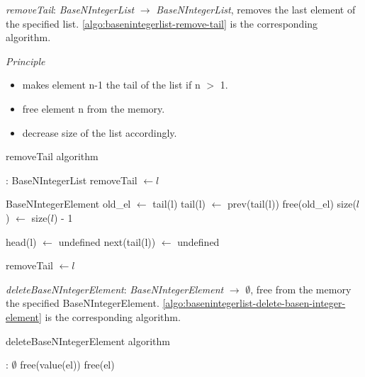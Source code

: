 \documentclass[book, nodocumentinfo]{upmethodology-document}
\begin{document}

\emph{removeTail}: \emph{BaseNIntegerList} \(\rightarrow\) \emph{BaseNIntegerList},
removes the last element of the specified list.
\ref{algo:basenintegerlist-remove-tail} is the corresponding algorithm.

\emph{Principle}
\begin{itemize}
    \item makes element n-1 the tail of the list if n \(>\) 1.
    \item free element n from the memory.
    \item decrease size of the list accordingly.
\end{itemize}

\begin{algorithm}[H]
    \label{algo:basenintegerlist-remove-tail}
    \caption{removeTail algorithm}

    \begin{algorithmic}
         : BaseNIntegerList
                \State removeTail \(\leftarrow l\)
            \EndIf

            \State BaseNIntegerElement old\_el \(\leftarrow\) tail(l)
            \State tail(l) \(\leftarrow\) prev(tail(l))
            \State free(old\_el)
            \State size(\(l\)) \(\leftarrow\) size(\(l\)) - 1

                \State head(l) \(\leftarrow\) undefined
            \Else
                \State next(tail(l)) \(\leftarrow\) undefined
            \EndIf

            \State removeTail \(\leftarrow l\)
        \EndFunction
    \end{algorithmic}
\end{algorithm}


\emph{deleteBaseNIntegerElement}: \emph{BaseNIntegerElement} \(\rightarrow\) \(\emptyset\),
free from the memory the specified BaseNIntegerElement.
\ref{algo:basenintegerlist-delete-basen-integer-element} is the corresponding algorithm.

\begin{algorithm}[H]
    \label{algo:basenintegerlist-delete-basen-integer-element}
    \caption{deleteBaseNIntegerElement algorithm}

    \begin{algorithmic}
         : \(\emptyset\)
            \State free(value(el))
            \State free(el)
        \EndFunction
    \end{algorithmic}
\end{algorithm}
\end{document}
